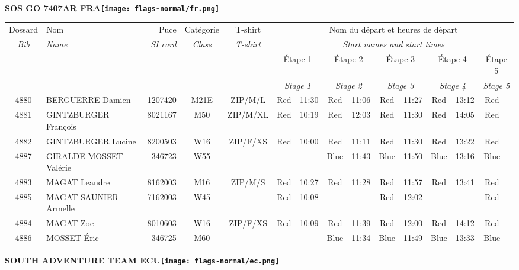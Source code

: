 \documentclass{report}
\begin{document}
\newpage
  \Huge \centering \bfseries SOS GO 7407AR FRA\normalfont \footnotesize \sffamily \hfill \texttt{[image: flags-normal/fr.png]} \newline 
  \begin{longtable}{|c|l|r|c|c|*{5}{cc|}}
    Dossard & Nom  & Puce    & Catégorie & T-shirt & \multicolumn{10}{c|}{Nom du départ et heures de départ} \\
    \itshape Bib     & \itshape Name & \itshape SI card & \itshape Class  & \itshape  T-shirt  & \multicolumn{10}{c|}{\itshape Start names and start times} \\
    \hline
    & & & & & \multicolumn{2}{c|}{Étape 1} & \multicolumn{2}{c|}{Étape 2} & \multicolumn{2}{c|}{Étape 3} & \multicolumn{2}{c|}{Étape 4} & \multicolumn{2}{c|}{Étape 5} \\
    & & & & & \multicolumn{2}{c|}{\itshape Stage 1} & \multicolumn{2}{c|}{\itshape Stage 2} & \multicolumn{2}{c|}{\itshape Stage 3} & \multicolumn{2}{c|}{\itshape Stage 4} & \multicolumn{2}{c|}{\itshape Stage 5} \\
    \hline
    4880 & BERGUERRE Damien & 1207420 & M21E & ZIP/M/L & Red & 11:30 & Red & 11:06 & Red & 11:27 & Red & 13:12 & Red &  \\
    4881 & GINTZBURGER François & 8021167 & M50 & ZIP/M/XL & Red & 10:19 & Red & 12:03 & Red & 11:30 & Red & 14:05 & Red &  \\
    4882 & GINTZBURGER Lucine & 8200503 & W16 & ZIP/F/XS & Red & 10:00 & Red & 11:11 & Red & 11:30 & Red & 13:22 & Red &  \\
    4887 & GIRALDE-MOSSET Valérie & 346723 & W55 &   & - &  - & Blue & 11:43 & Blue & 11:50 & Blue & 13:16 & Blue &  \\
    4883 & MAGAT Leandre & 8162003 & M16 & ZIP/M/S & Red & 10:27 & Red & 11:28 & Red & 11:57 & Red & 13:41 & Red &  \\
    4885 & MAGAT SAUNIER Armelle & 7162003 & W45 &   & Red & 10:08 & - &  - & Red & 12:02 & - &  - & Red &  \\
    4884 & MAGAT Zoe & 8010603 & W16 & ZIP/F/XS & Red & 10:09 & Red & 11:39 & Red & 12:00 & Red & 14:12 & Red &  \\
    4886 & MOSSET Éric & 346725 & M60 &   & - &  - & Blue & 11:34 & Blue & 11:49 & Blue & 13:33 & Blue &  \\
  \end{longtable}
\newpage
  \Huge \centering \bfseries SOUTH ADVENTURE TEAM  ECU\normalfont \footnotesize \sffamily \hfill \texttt{[image: flags-normal/ec.png]} \newline 
\end{document}
